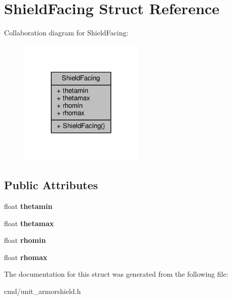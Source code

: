 \hypertarget{structShieldFacing}{}\section{Shield\+Facing Struct Reference}
\label{structShieldFacing}


Collaboration diagram for Shield\+Facing\+:
\nopagebreak
\begin{figure}[H]
\begin{center}
\leavevmode
\includegraphics[width=168pt]{d3/d3a/structShieldFacing__coll__graph}
\end{center}
\end{figure}
\subsection*{Public Attributes}
\begin{DoxyCompactItemize}
\item 
float {\bfseries thetamin}\hypertarget{structShieldFacing_a3cf698ee0bf728bdfff216488d1cb8fd}{}\label{structShieldFacing_a3cf698ee0bf728bdfff216488d1cb8fd}

\item 
float {\bfseries thetamax}\hypertarget{structShieldFacing_abc0e4c0fab5fb856cbcaba817d86278b}{}\label{structShieldFacing_abc0e4c0fab5fb856cbcaba817d86278b}

\item 
float {\bfseries rhomin}\hypertarget{structShieldFacing_abe17f6af6431d7f4432e678793c60deb}{}\label{structShieldFacing_abe17f6af6431d7f4432e678793c60deb}

\item 
float {\bfseries rhomax}\hypertarget{structShieldFacing_aa984b51c17bf632cde04e6afa6152323}{}\label{structShieldFacing_aa984b51c17bf632cde04e6afa6152323}

\end{DoxyCompactItemize}


The documentation for this struct was generated from the following file\+:\begin{DoxyCompactItemize}
\item 
cmd/unit\+\_\+armorshield.\+h\end{DoxyCompactItemize}
